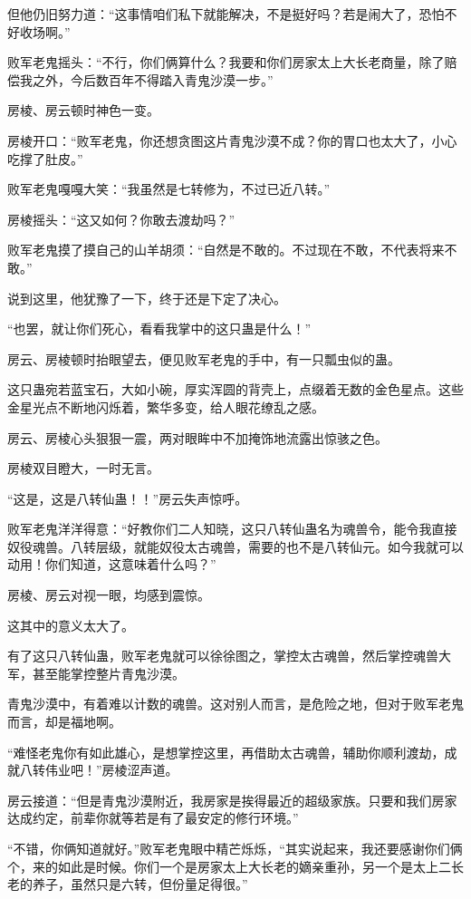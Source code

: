 \begin{this_body}
但他仍旧努力道：“这事情咱们私下就能解决，不是挺好吗？若是闹大了，恐怕不好收场啊。”

败军老鬼摇头：“不行，你们俩算什么？我要和你们房家太上大长老商量，除了赔偿我之外，今后数百年不得踏入青鬼沙漠一步。”

房棱、房云顿时神色一变。

房棱开口：“败军老鬼，你还想贪图这片青鬼沙漠不成？你的胃口也太大了，小心吃撑了肚皮。”

败军老鬼嘎嘎大笑：“我虽然是七转修为，不过已近八转。”

房棱摇头：“这又如何？你敢去渡劫吗？”

败军老鬼摸了摸自己的山羊胡须：“自然是不敢的。不过现在不敢，不代表将来不敢。”

说到这里，他犹豫了一下，终于还是下定了决心。

“也罢，就让你们死心，看看我掌中的这只蛊是什么！”

房云、房棱顿时抬眼望去，便见败军老鬼的手中，有一只瓢虫似的蛊。

这只蛊宛若蓝宝石，大如小碗，厚实浑圆的背壳上，点缀着无数的金色星点。这些金星光点不断地闪烁着，繁华多变，给人眼花缭乱之感。

房云、房棱心头狠狠一震，两对眼眸中不加掩饰地流露出惊骇之色。

房棱双目瞪大，一时无言。

“这是，这是八转仙蛊！！”房云失声惊呼。

败军老鬼洋洋得意：“好教你们二人知晓，这只八转仙蛊名为魂兽令，能令我直接奴役魂兽。八转层级，就能奴役太古魂兽，需要的也不是八转仙元。如今我就可以动用！你们知道，这意味着什么吗？”

房棱、房云对视一眼，均感到震惊。

这其中的意义太大了。

有了这只八转仙蛊，败军老鬼就可以徐徐图之，掌控太古魂兽，然后掌控魂兽大军，甚至能掌控整片青鬼沙漠。

青鬼沙漠中，有着难以计数的魂兽。这对别人而言，是危险之地，但对于败军老鬼而言，却是福地啊。

“难怪老鬼你有如此雄心，是想掌控这里，再借助太古魂兽，辅助你顺利渡劫，成就八转伟业吧！”房棱涩声道。

房云接道：“但是青鬼沙漠附近，我房家是挨得最近的超级家族。只要和我们房家达成约定，前辈你就等若是有了最安定的修行环境。”

“不错，你俩知道就好。”败军老鬼眼中精芒烁烁，“其实说起来，我还要感谢你们俩个，来的如此是时候。你们一个是房家太上大长老的嫡亲重孙，另一个是太上二长老的养子，虽然只是六转，但份量足得很。”


\end{this_body}
